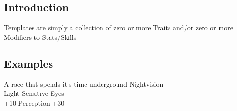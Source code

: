 
\subsection{Introduction}
\Glspl{Template} are simply a collection of zero or more \glspl{Trait}
and/or zero or more \glspl{Modifier} to \glspl{Stat}/\glspl{Skill}

\subsection{Examples}

	{A race that spends it's time underground}
	{
		Nightvision \\
		Light-Sensitive Eyes \\
		+10 Perception
	}
	{+30}
